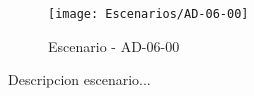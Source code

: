 \begin{figure}[H]
\centering
\texttt{[image: Escenarios/AD-06-00]}
\caption{Escenario - AD-06-00}
\label{fig:AD-06-00}
\end{figure}

Descripcion escenario...
\clearpage
